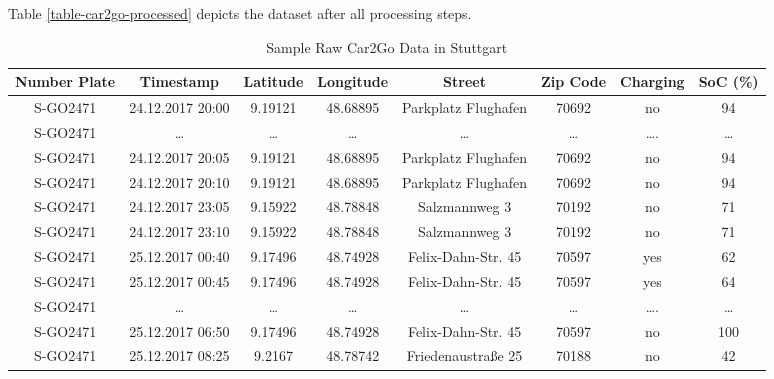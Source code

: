 \documentclass[a4paper, 12pt]{article}
\begin{document}
Table \ref{table-car2go-processed} depicts the dataset after all processing steps.

\begin{table}
    \caption{Sample Raw Car2Go Data in Stuttgart \label{table-car2go-raw}}
    \centering
    \begin{tabular}{c|ccccccc}
      \hline
      \hline
      Number Plate & Timestamp & Latitude & Longitude & Street & Zip Code & Charging & SoC (\%)\\
      \hline
      S-GO2471 & 24.12.2017 20:00 & 9.19121 & 48.68895 & Parkplatz Flughafen & 70692 & no & 94\\
      S-GO2471 & \ldots{} & \ldots{} & \ldots{} & \ldots{} & \ldots{} & \ldots{}. & \ldots{}\\
      S-GO2471 & 24.12.2017 20:05 & 9.19121 & 48.68895 & Parkplatz Flughafen & 70692 & no & 94\\
      S-GO2471 & 24.12.2017 20:10 & 9.19121 & 48.68895 & Parkplatz Flughafen & 70692 & no & 94\\
      S-GO2471 & 24.12.2017 23:05 & 9.15922 & 48.78848 & Salzmannweg 3 & 70192 & no & 71\\
      S-GO2471 & 24.12.2017 23:10 & 9.15922 & 48.78848 & Salzmannweg 3 & 70192 & no & 71\\
      S-GO2471 & 25.12.2017 00:40 & 9.17496 & 48.74928 & Felix-Dahn-Str. 45 & 70597 & yes & 62\\
      S-GO2471 & 25.12.2017 00:45 & 9.17496 & 48.74928 & Felix-Dahn-Str. 45 & 70597 & yes & 64\\
      S-GO2471 & \ldots{} & \ldots{} & \ldots{} & \ldots{} & \ldots{} & \ldots{}. & \ldots{}\\
      S-GO2471 & 25.12.2017 06:50 & 9.17496 & 48.74928 & Felix-Dahn-Str. 45 & 70597 & no & 100\\
      S-GO2471 & 25.12.2017 08:25 & 9.2167 & 48.78742 & Friedenaustraße 25 & 70188 & no & 42\\
      \hline
      \hline
    \end{tabular}

    \bigskip\bigskip  %


\end{table}
\end{document}
